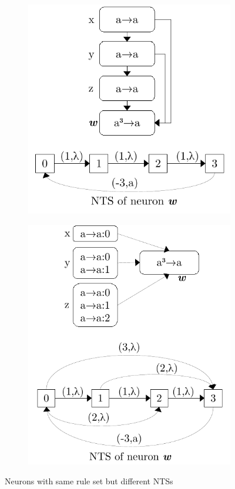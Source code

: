 \documentclass[]{elsarticle}
\theoremstyle{definition}
\theoremstyle{definition}
\begin{document}
\begin{figure}[H]
   \centering
   \begin{subfigure}{0.49\textwidth}
      \centering
      \includegraphics[scale=0.60]{fig-lts-2a.pdf}
      \caption{}
      \label{fig-nts-2a}
   \end{subfigure}
   \begin{subfigure}{0.49\textwidth}
      \centering
      \includegraphics[scale=0.60]{fig-lts-2b.pdf}
      \caption{}
      \label{fig-nts-2b}
   \end{subfigure}
   \caption{Neurons with same rule set but different NTSs}
   \label{fig-nts-2}
\end{figure}
\end{document}
